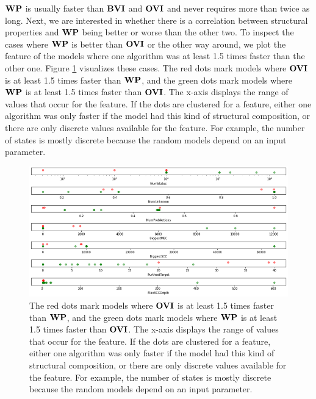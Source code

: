 $\WP$ is usually faster than $\mathbf{BVI}$ and $\OVI$ and never requires more than twice as long.
Next, we are interested in whether there is a correlation between structural properties and $\WP$ being better or worse than the other two.
To inspect the cases where $\WP$ is better than $\OVI$ or the other way around, we plot the feature of the models where one algorithm was at least
1.5 times faster than the other one. Figure \ref{fig:WPvsOVIon1DFeatureScatter} visualizes these cases. 
The red dots mark models where $\OVI$ is at least 1.5 times faster than $\WP$, and the green dots mark models where $\WP$ is at least 1.5 times faster than $\OVI$.
The x-axis displays the range of values that occur for the feature. 
If the dots are clustered for a feature, either one algorithm was only faster if the model had this kind of structural composition, 
or there are only discrete values available for the feature. For example, the number of states is mostly discrete because the random models depend on an input parameter.

\begin{figure}[t]
    \centering
    \includegraphics[width=1\textwidth]{figures/WPvsOVIon1DFeatureScatter.png}
    \caption[$\WP$ compared to $\OVI$]{
        The red dots mark models where $\OVI$ is at least 1.5 times faster than $\WP$, and the green dots mark models where $\WP$ is at least 1.5 times faster than $\OVI$.
        The x-axis displays the range of values that occur for the feature. 
        If the dots are clustered for a feature, either one algorithm was only faster if the model had this kind of structural composition, 
        or there are only discrete values available for the feature. For example, the number of states is mostly discrete because the random models depend on an input parameter.
    }
    \label{fig:WPvsOVIon1DFeatureScatter}
\end{figure}

